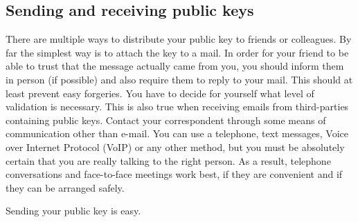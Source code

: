 \subsection{Sending and receiving public keys}

There are multiple ways to distribute your public key to friends or
colleagues. By far the simplest way is to attach the key to a mail. In
order for your friend to be able to trust that the message actually came
from you, you should inform them in person (if possible) and also
require them to reply to your mail. This should at least prevent easy
forgeries. You have to decide for yourself what level of validation is
necessary. This is also true when receiving emails from third-parties
containing public keys. Contact your correspondent through some means of
communication other than e-mail. You can use a telephone, text messages,
Voice over Internet Protocol (VoIP) or any other method, but you must be
absolutely certain that you are really talking to the right person. As a
result, telephone conversations and face-to-face meetings work best, if
they are convenient and if they can be arranged safely.

Sending your public key is easy.

